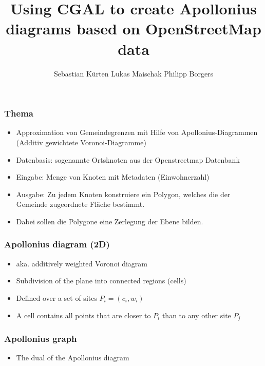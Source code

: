 \documentclass{beamer}
\title{Using CGAL to create Apollonius diagrams based on OpenStreetMap data}
\author[Sebastian Kürten, Philipp Borgers, Lukas Maischak]{
    Sebastian Kürten
    \newline Lukas Maischak
    \newline Philipp Borgers
}
\begin{document}
\begin{frame}
    \titlepage
\end{frame}

\begin{frame}
    \frametitle{Thema}
    \begin{itemize}
        \item Approximation von Gemeindegrenzen mit Hilfe von Apollonius-Diagrammen
        (Additiv gewichtete Voronoi-Diagramme)
        \item Datenbasis: sogenannte Ortsknoten aus der Openstreetmap Datenbank
        \item Eingabe: Menge von Knoten mit Metadaten (Einwohnerzahl)
        \item Ausgabe: Zu jedem Knoten konstruiere ein Polygon, welches die der Gemeinde
        zugeordnete Fläche bestimmt.
        \item Dabei sollen die Polygone eine Zerlegung der Ebene bilden.
    \end{itemize}
\end{frame}

\begin{frame}
    \frametitle{Apollonius diagram (2D)}
    \begin{itemize}
        \item aka. additively weighted Voronoi diagram
        \item Subdivision of the plane into connected regions (cells)
        \item Defined over a set of sites $P_i = (c_i, w_i)$
        \item A cell contains all points that are closer to $P_i$ than to any
            other site $P_j$
    \end{itemize}
\end{frame}

\begin{frame}
    \frametitle{Apollonius graph}
    \begin{itemize}
        \item The dual of the Apollonius diagram
    \end{itemize}
\end{frame}
\end{document}
